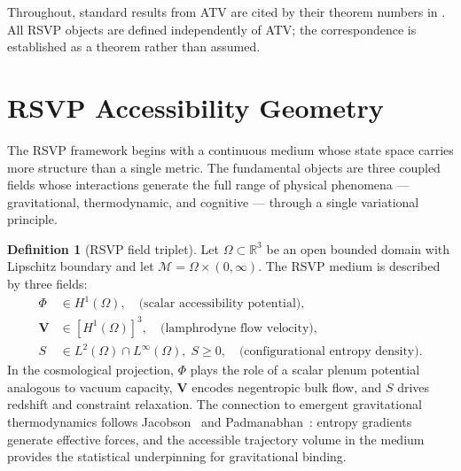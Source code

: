 \documentclass[12pt,a4paper]{article}
\theoremstyle{plain}
\theoremstyle{definition}
\newtheorem{definition}[theorem]{Definition}
\theoremstyle{remark}
\begin{document}
Throughout, standard results from ATV are cited by their theorem numbers in
\cite{ATV2026}. All RSVP objects are defined independently of ATV; the
correspondence is established as a theorem rather than assumed.

\section{RSVP Accessibility Geometry}
\label{sec:geometry}

The RSVP framework begins with a continuous medium whose state space carries more
structure than a single metric. The fundamental objects are three coupled fields
whose interactions generate the full range of physical phenomena --- gravitational,
thermodynamic, and cognitive --- through a single variational principle.

\begin{definition}[RSVP field triplet]
\label{def:triplet}
Let $\Omega \subset \mathbb{R}^3$ be an open bounded domain with Lipschitz
boundary and let $\mathcal{M} = \Omega \times (0,\infty)$. The RSVP medium is
described by three fields:
\begin{align}
  \Phi &\in H^1(\Omega), \quad \text{(scalar accessibility potential)},
  \label{eq:field_phi} \\
  \mathbf{V} &\in [H^1(\Omega)]^3, \quad \text{(lamphrodyne flow velocity)},
  \label{eq:field_V} \\
  S &\in L^2(\Omega)\cap L^\infty(\Omega),\; S\geq 0, \quad
    \text{(configurational entropy density)}.
  \label{eq:field_S}
\end{align}
In the cosmological projection, $\Phi$ plays the role of a scalar plenum potential
analogous to vacuum capacity, $\mathbf{V}$ encodes negentropic bulk flow, and $S$
drives redshift and constraint relaxation. The connection to emergent gravitational
thermodynamics follows Jacobson~\cite{Jacobson1995} and Padmanabhan~\cite{Padmanabhan2010}:
entropy gradients generate effective forces, and the accessible trajectory volume
in the medium provides the statistical underpinning for gravitational binding.
\end{definition}
\end{document}
